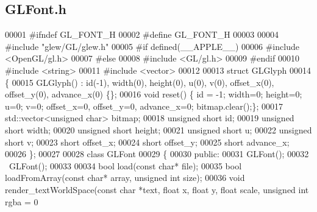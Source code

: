 \subsection{G\+L\+Font.\+h}
\label{GLFont_8h_source}

\begin{DoxyCode}
00001 \textcolor{preprocessor}{#ifndef GL\_FONT\_H}
00002 \textcolor{preprocessor}{#define GL\_FONT\_H}
00003 
00004 \textcolor{preprocessor}{#include "glew/GL/glew.h"}
00005 \textcolor{preprocessor}{#if defined(\_\_APPLE\_\_)}
00006 \textcolor{preprocessor}{#include <OpenGL/gl.h>}
00007 \textcolor{preprocessor}{#else}
00008 \textcolor{preprocessor}{#include <GL/gl.h>}
00009 \textcolor{preprocessor}{#endif}
00010 \textcolor{preprocessor}{#include <string>}
00011 \textcolor{preprocessor}{#include <vector>}
00012 
00013 \textcolor{keyword}{struct }GLGlyph
00014 \{
00015     GLGlyph() : id(-1), width(0), height(0), u(0), v(0), offset_x(0), offset_y(0), 
      advance_x(0) \{\};
00016     \textcolor{keywordtype}{void} reset() \{ \textcolor{keywordtype}{id} = -1; width=0; height=0; u=0; v=0; offset_x=0, offset_y=0, 
      advance_x=0; bitmap.clear();\};
00017     std::vector<unsigned char> bitmap;
00018     \textcolor{keywordtype}{unsigned} \textcolor{keywordtype}{short} id;
00019     \textcolor{keywordtype}{unsigned} \textcolor{keywordtype}{short} width;
00020     \textcolor{keywordtype}{unsigned} \textcolor{keywordtype}{short} height;
00021     \textcolor{keywordtype}{unsigned} \textcolor{keywordtype}{short} u;
00022     \textcolor{keywordtype}{unsigned} \textcolor{keywordtype}{short} v;
00023     \textcolor{keywordtype}{short} offset_x;
00024     \textcolor{keywordtype}{short} offset_y;
00025     \textcolor{keywordtype}{short} advance_x;
00026 \};
00027 
00028 \textcolor{keyword}{class }GLFont
00029 \{
00030 \textcolor{keyword}{public}:
00031     GLFont();
00032     ~GLFont();
00033 
00034     \textcolor{keywordtype}{bool} load(\textcolor{keyword}{const} \textcolor{keywordtype}{char}* file);
00035     \textcolor{keywordtype}{bool} loadFromArray(\textcolor{keyword}{const} \textcolor{keywordtype}{char}* array, \textcolor{keywordtype}{unsigned} \textcolor{keywordtype}{int} size);
00036     \textcolor{keywordtype}{void} render\_textWorldSpace(\textcolor{keyword}{const} \textcolor{keywordtype}{char} *text, \textcolor{keywordtype}{float} x, \textcolor{keywordtype}{float} y, \textcolor{keywordtype}{float} scale, \textcolor{keywordtype}{unsigned} \textcolor{keywordtype}{int} rgba = 0

\end{DoxyCode}
